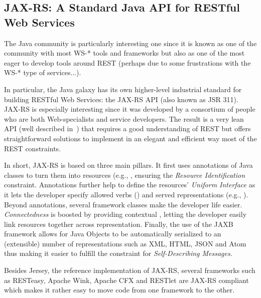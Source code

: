 \subsection{JAX-RS: A Standard Java API for RESTful Web Services}
The Java community is particularly interesting one since it is known as one of the community with most WS-* tools and frameworks but also as one of the most eager to develop tools around REST (perhaps due to some frustrations with the WS-* type of services...).

In particular, the Java galaxy has its own higher-level industrial standard for building RESTful Web Services: the JAX-RS API (also known as JSR 311). JAX-RS is especially interesting since it was developed by a consortium of people who are both Web-specialists and service developers. The result is a very lean API (well described in~\cite{burke_restful_2009}) that requires a good understanding of REST but offers straightforward solutions to implement in an elegant and efficient way most of the REST constraints.

In short, JAX-RS is based on three main pillars. It first uses annotations of Java classes to turn them into resources (e.g., , ensuring the \emph{Resource Identification} constraint. Annotations further help to define the resources' \emph{Uniform Interface} as it lets the developer specify allowed verbs () and served representations (e.g., ).
Beyond annotations, several framework classes make the developer life easier. \emph{Connectedness} is boosted by providing contextual , letting the developer easily link resources together across representation. Finally, the use of the JAXB framework allows for Java Objects to be automatically serialized to an (extensible) number of representations such as XML, HTML, JSON and Atom thus making it easier to fulfill the constraint for \emph{Self-Describing Messages}.

Besides Jersey, the reference implementation of JAX-RS, several frameworks such as RESTeasy, Apache Wink, Apache CFX and RESTlet are JAX-RS compliant which makes it rather easy to move code from one framework to the other.

